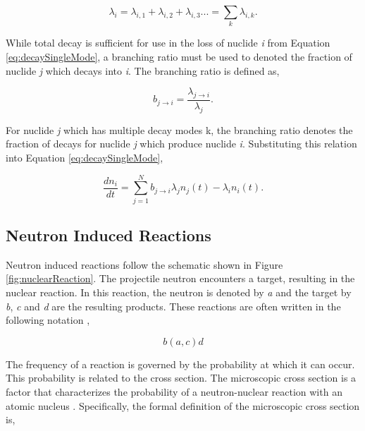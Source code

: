 \clearpage

\begin{equation}
    \lambda_{i} = \lambda_{i,1} + \lambda_{i,2} + \lambda_{i,3} ... = \sum_{k} \lambda_{i,k}.
\end{equation}

\noindent While total decay is sufficient for use in the loss of nuclide \textit{i} from Equation \ref{eq:decaySingleMode}, a branching ratio must be used to denoted the fraction of nuclide \textit{j} which decays into \textit{i}. The branching ratio is defined as,

\begin{equation}
    b_{j\rightarrow i} = \frac{\lambda_{j\rightarrow i}}{\lambda_{j}}.
\end{equation}

\noindent For nuclide \textit{j} which has multiple decay modes k, the branching ratio denotes the fraction of decays for nuclide \textit{j} which produce nuclide \textit{i}. Substituting this relation into Equation \ref{eq:decaySingleMode},

\begin{equation}
    \frac{dn_{i}}{dt} = \sum_{j=1}^{N} b_{j\rightarrow i}\lambda_{j}n_{j}(t) -\lambda_{i} n_{i}(t).
    \label{eq:decay}
\end{equation}




\subsection{Neutron Induced Reactions}
Neutron induced reactions follow the schematic shown in Figure \ref{fig:nuclearReaction}.  The projectile neutron encounters a target, resulting in the nuclear reaction. In this reaction, the neutron is denoted by \textit{a} and the target by \textit{b}, \textit{c} and \textit{d} are the resulting products. These reactions are often written in the following notation \cite{duderstadt1976},

\begin{equation*}
    b (a,c) d 
\end{equation*}



The frequency of a reaction is governed by the probability at which it can occur. This probability is related to the  cross section. The microscopic cross section is a factor that characterizes the probability of a neutron-nuclear reaction with an atomic nucleus \cite{duderstadt1976}. Specifically, the formal definition of the microscopic cross section is,

